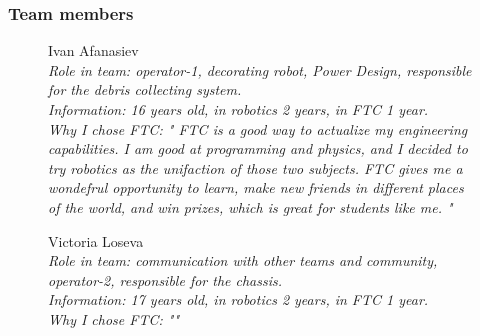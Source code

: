 \subsubsection{Team members}
\begin{figure}[H]
	\hfill
	\begin{minipage}[h]{0.47\linewidth}
		Ivan Afanasiev \\
		\emph{Role in team: operator-1, decorating robot, Power Design, responsible for the debris collecting system.\\}
		\emph{Information: 16 years old, in robotics 2 years, in FTC 1 year. \\}
		\emph{Why I chose FTC: " FTC is a good way to actualize my engineering capabilities. I am good at programming and physics, and I decided to try robotics as the unifaction of those two subjects. FTC gives me a wondefrul opportunity to learn, make new friends in different places of the world, and win prizes, which is great for students like me. "}		
	\end{minipage}
	\vfill 
\end{figure}

\begin{figure}[H]
	\begin{minipage}[h]{0.47\linewidth}
		Victoria Loseva\\
		\emph{Role in team: communication with other teams and community, operator-2, responsible for the chassis. \\  }
		\emph{Information: 17 years old, in robotics 2 years, in FTC 1 year. \\}
		\emph{Why I chose FTC: ""}					
	\end{minipage}
	\hfill
\end{figure}


